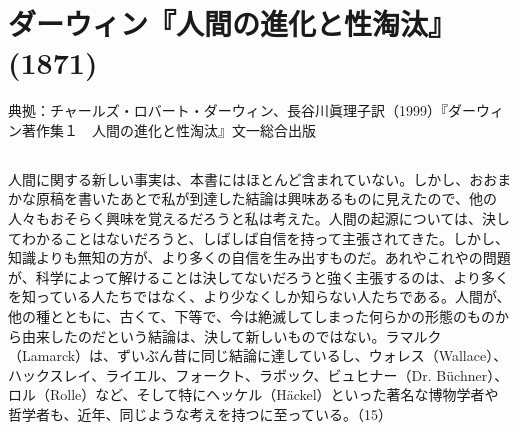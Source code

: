 \section{ダーウィン『人間の進化と性淘汰』 (1871)}



典拠：チャールズ・ロバート・ダーウィン、長谷川眞理子訳（1999）『ダーウィン著作集１　人間の進化と性淘汰』文一総合出版


\subsection{}


人間に関する新しい事実は、本書にはほとんど含まれていない。しかし、おおまかな原稿を書いたあとで私が到達した結論は興味あるものに見えたので、他の人々もおそらく興味を覚えるだろうと私は考えた。人間の起源については、決してわかることはないだろうと、しばしば自信を持って主張されてきた。しかし、知識よりも無知の方が、より多くの自信を生み出すものだ。あれやこれやの問題が、科学によって解けることは決してないだろうと強く主張するのは、より多くを知っている人たちではなく、より少なくしか知らない人たちである。人間が、他の種とともに、古くて、下等で、今は絶滅してしまった何らかの形態のものから由来したのだという結論は、決して新しいものではない。ラマルク（Lamarck）は、ずいぶん昔に同じ結論に達しているし、ウォレス（Wallace）、ハックスレイ、ライエル、フォークト、ラボック、ビュヒナー（Dr. Büchner）、ロル（Rolle）など、そして特にヘッケル（Häckel）といった著名な博物学者や哲学者も、近年、同じような考えを持つに至っている。（15）

\subsection{}


